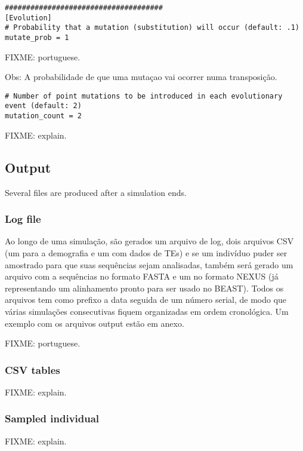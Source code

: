 \documentclass[10pt]{article}
\begin{document}
\begin{verbatim}
#####################################
[Evolution]
# Probability that a mutation (substitution) will occur (default: .1)
mutate_prob = 1
\end{verbatim}

FIXME: portuguese.

Obs: A probabilidade de que uma mutaçao vai ocorrer numa transposição.

\begin{verbatim}
# Number of point mutations to be introduced in each evolutionary event (default: 2)
mutation_count = 2
\end{verbatim}

FIXME: explain.

\subsection{Output}
\label{sec:output}

Several files are produced after a simulation ends.

\subsubsection{Log file}
\label{sec:output_log}

Ao longo de uma simulação, são gerados um arquivo de log, dois
arquivos CSV (um para a demografia e um com dados de TEs) e se um
indivíduo puder ser amostrado para que suas sequências sejam
analisadas, também será gerado um arquivo com a sequências no formato
FASTA e um no formato NEXUS (já representando um alinhamento pronto
para ser usado no BEAST). Todos os arquivos tem como prefixo a data
seguida de um número serial, de modo que várias simulações
consecutivas fiquem organizadas em ordem cronológica. Um exemplo com
os arquivos output estão em anexo.

FIXME: portuguese.

\subsubsection{CSV tables}
\label{sec:output_csv}

FIXME: explain.

\subsubsection{Sampled individual}
\label{sec:output_sample}

FIXME: explain.
\end{document}
